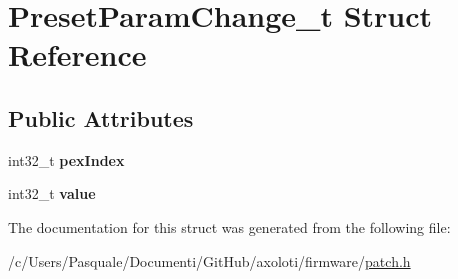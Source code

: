 \hypertarget{structPresetParamChange__t}{}\section{Preset\+Param\+Change\+\_\+t Struct Reference}
\label{structPresetParamChange__t}
\subsection*{Public Attributes}
\begin{DoxyCompactItemize}
\item 
int32\+\_\+t {\bfseries pex\+Index}
\item 
int32\+\_\+t {\bfseries value}
\end{DoxyCompactItemize}


The documentation for this struct was generated from the following file\+:\begin{DoxyCompactItemize}
\item 
/c/\+Users/\+Pasquale/\+Documenti/\+Git\+Hub/axoloti/firmware/\hyperlink{patch_8h}{patch.\+h}\end{DoxyCompactItemize}
